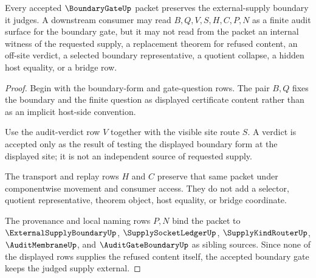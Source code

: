 \begin{theorem}
\label{thm:boundary-gate-noninternalization}
Every accepted $\BoundaryGateUp$ packet preserves the external-supply boundary it judges. A downstream consumer may read $B,Q,V,S,H,C,P,N$ as a finite audit surface for the boundary gate, but it may not read from the packet an internal witness of the requested supply, a replacement theorem for refused content, an off-site verdict, a selected boundary representative, a quotient collapse, a hidden host equality, or a bridge row.
\end{theorem}
\begin{proof}
Begin with the boundary-form and gate-question rows. The pair $B,Q$ fixes the boundary and the finite question as displayed certificate content rather than as an implicit host-side convention.

Use the audit-verdict row $V$ together with the visible site route $S$. A verdict is accepted only as the result of testing the displayed boundary form at the displayed site; it is not an independent source of requested supply.

The transport and replay rows $H$ and $C$ preserve that same packet under componentwise movement and consumer access. They do not add a selector, quotient representative, theorem object, host equality, or bridge coordinate.

The provenance and local naming rows $P,N$ bind the packet to $\ExternalSupplyBoundaryUp$, $\SupplySocketLedgerUp$, $\SupplyKindRouterUp$, $\AuditMembraneUp$, and $\AuditGateBoundaryUp$ as sibling sources. Since none of the displayed rows supplies the refused content itself, the accepted boundary gate keeps the judged supply external.
\end{proof}

